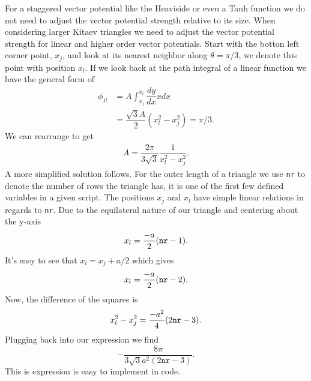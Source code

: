 For a staggered vector potential like the Heaviside or even a Tanh function we do not need to adjust the vector potential strength relative to its size.
When considering larger Kitaev triangles we need to adjust the vector potential strength for linear and higher order vector potentials.
Start with the botton left corner point, $x_j$, and look at its nearest neighbor along $\theta=\pi/3$, we denote this point with position $x_l$.
If we look back at the path integral of a linear function we have the general form of
\begin{align}
  \phi_{jl} &= A \int_{x_j}^{x_l} \dfrac{dy}{dx} x dx \nonumber \\
  &= \dfrac{\sqrt{3} A}{2} (x_l^2 - x_j^2) = \pi/3. \nonumber
\end{align}
We can rearrange to get
\begin{align}
  A = \dfrac{2 \pi}{3 \sqrt{3}} \dfrac{1}{x_l^2 - x_j^2}.
\end{align}
A more simplified solution follows.
For the outer length of a triangle we use \verb|nr| to denote the number of rows the triangle has, it is one of the first few defined variables in a given script.
The positions $x_j$ and $x_l$ have simple linear relations in regards to \verb|nr|.
Due to the equilateral nature of our triangle and centering about the y-axis
\begin{equation}
  x_l = \dfrac{-a}{2} (\verb|nr| - 1).
\end{equation}
It's easy to see that $x_l = x_j + a/2$ which gives
\begin{equation}
  x_l = \dfrac{-a}{2} (\verb|nr| - 2).
\end{equation}
Now, the difference of the squares is
\begin{equation}
  x_l^2 - x_j^2 = \dfrac{-a^2}{4} (2 \verb|nr| - 3).
\end{equation}
Plugging back into our expression we find
\begin{equation}
  -\dfrac{8 \pi}{3 \sqrt{3} a^2 (2 \texttt{nr}- 3)}.
\end{equation}
This is expression is easy to implement in code.
